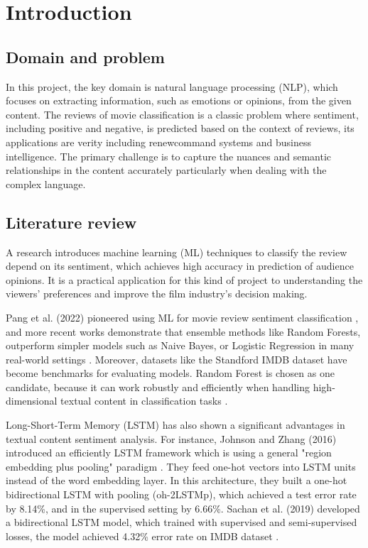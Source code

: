 \section{Introduction}

\subsection{Domain and problem}
In this project, the key domain is natural language processing (NLP), which focuses on extracting information, such as emotions or opinions, from the given content. The reviews of movie classification is a classic problem where sentiment, including positive and negative, is predicted based on the context of reviews, its applications are verity including renewcommand systems and business intelligence. The primary challenge is to capture the nuances and semantic relationships in the content accurately particularly when dealing with the complex language. 

\subsection{Literature review}
A research \cite{pang2008opinion} introduces machine learning (ML) techniques to classify the review depend on its sentiment, which achieves high accuracy in prediction of audience opinions. It is a practical application for this kind of project to understanding the viewers' preferences and improve the film industry's decision making. 

Pang et al. (2022) pioneered using ML for movie review sentiment classification \cite{pang2002thumbs}, and more recent works demonstrate that ensemble methods like Random Forests, outperform simpler models such as Naive Bayes, or Logistic Regression in many real-world settings \cite{breiman2001random,go2009twitter}. Moreover, datasets like the Standford IMDB dataset \cite{maas2011learning} have become benchmarks for evaluating models. Random Forest is chosen as one candidate, because it can work robustly and efficiently when handling high-dimensional textual content in classification tasks \cite{kowsari2019text}. 

Long-Short-Term Memory (LSTM) has also shown a significant advantages in textual content sentiment analysis. For instance, Johnson and Zhang (2016) introduced an efficiently LSTM framework which is using a general "region embedding plus pooling" paradigm \cite{johnson2016supervised}. They feed one-hot vectors into LSTM units instead of the word embedding layer. In this architecture, they built a one-hot bidirectional LSTM with pooling (oh-2LSTMp), which achieved a test error rate by 8.14\%, and in the supervised setting by 6.66\%. Sachan et al. (2019) developed a bidirectional LSTM model, which trained with supervised and semi-supervised losses, the model achieved 4.32\% error rate on IMDB dataset \cite{sachan2019revisiting}.

